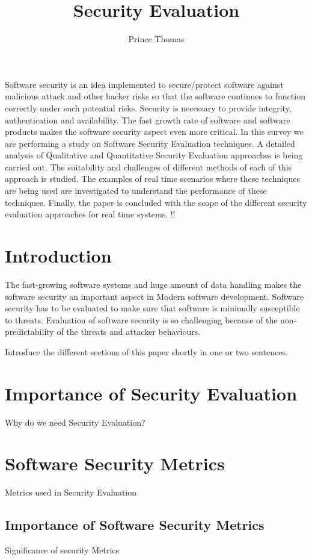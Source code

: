\documentclass[pdftex,english,oribibl]{llncs}
\title{Security Evaluation}
\author{Prince Thomas}
\institute{University of Stuttgart\\Institute of Software Technology (ISTE)\\70569 Stuttgart, Germany}
\makeatletter
\gdef\@keywords{}
\renewenvironment{abstract}{%
  \list{}{\advance\topsep by0.35cm\relax\small%
          \leftmargin=1cm%
          \labelwidth=\z@%
          \listparindent=\z@%
          \itemindent\listparindent%
          \rightmargin\leftmargin}%
          \item[\hskip\labelsep\bfseries\abstractname]}{%
  \if!\@keywords!\else{\item[~]\item[\hskip\labelsep\bfseries\keywordname]\@keywords}\fi%
  \endlist}
\makeatother
\begin{document}
\maketitle

\begin{abstract}
Software security is an idea implemented to secure/protect software against malicious attack and other hacker risks so that the software continues to function correctly under such potential risks. Security is necessary to provide integrity, authentication and availability. The fast growth rate of software and software products makes the software security aspect even more critical. In this survey we are performing a study on Software Security Evaluation techniques. A detailed analysis of Qualitative and Quantitative Security Evaluation approaches is being carried out. The suitability and challenges of different methods of each of this approach is studied. The examples of real time scenarios where these techniques are being used are investigated to understand the performance of these techniques. Finally, the paper is concluded with the scope of the different security evaluation approaches for real time systems.
\end{abstract}

\section{Introduction}

  The fast-growing software systems and huge amount of data handling makes the software security an important aspect in Modern software development. Software security has to be evaluated to make sure that software is minimally susceptible to threats. Evaluation of software security is so challenging because of the non-predictability of the threats and attacker behaviours.

  Introduce the different sections of this paper shortly in one or two sentences.

  
\section{Importance of Security Evaluation}
Why do we need Security Evaluation?

\section{Software Security Metrics}
Metrics used in Security Evaluation
\subsection{Importance of Software Security Metrics}
Significance of security Metrics
\end{document}
